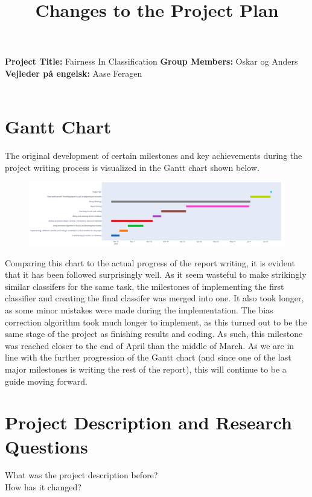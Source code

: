 \documentclass[11pt, fleqn]{article}
\title{Changes to the Project Plan}
\date{}
\begin{document}
	\maketitle
	\noindent
	\vspace*{-1.4cm}
	\noindent
	\textbf{Project Title:} Fairness In Classification \newline \noindent
	\textbf{Group Members:} Oskar og Anders \newline  \noindent
	\textbf{Vejleder på engelsk:} Aase Feragen \noindent
	\\\\
	
	\section*{Gantt Chart}
	\noindent The original development of certain milestones and key achievements during the project writing process is visualized in the Gantt chart shown below. 
	\begin{figure}[H]
		\centering
		\includegraphics[width=\linewidth]{Gantt}
	\end{figure}

	Comparing this chart to the actual progress of the report writing, it is evident that it has been followed surprisingly well. As it seem wasteful to make strikingly similar classifers for the same task, the milestones of implementing the first classifier and creating the final classifer was merged into one. It also took longer, as some minor mistakes were made during the implementation. The bias correction algorithm took much longer to implement, as this turned out to be the same stage of the project as finishing results and coding. As such, this milestone was reached closer to the end of April than the middle of March. As we are in line with the further progression of the Gantt chart (and since one of the last major milestones is writing the rest of the report), this will continue to be a guide moving forward.
	
	\section*{Project Description and Research Questions}
	What was the project description before? \\
	How has it changed?
	
\end{document}
